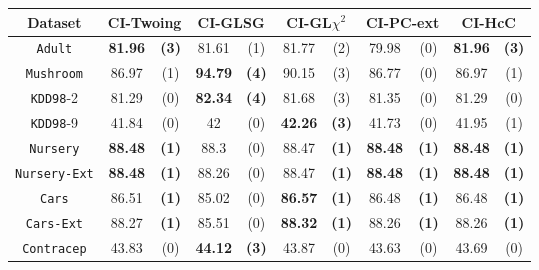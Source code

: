 \begin{table*}
\small
\centering
\begin{tabular}{c|cc|cc|cc|cc|cc} 
Dataset  &   \multicolumn{2}{c|}{CI-Twoing} &   \multicolumn{2}{c|}{CI-GLSG} & \multicolumn{2}{c|}{CI-GL$\chi^2$}& \multicolumn{2}{c|}{CI-PC-ext}& \multicolumn{2}{c}{CI-HcC} \\  \hline   
{\tt Adult}        &{\bf 81.96} &{\bf  (3)} & 81.61       & (1)       & 81.77       & (2)       & 79.98       & (0)       & {\bf 81.96} & {\bf  (3)}  \\
{\tt Mushroom}     &86.97       & (1)       &{\bf  94.79 }& {\bf (4)} & 90.15       & (3)       & 86.77       & (0)       & 86.97       & (1)         \\
{\tt KDD98}-2      &81.29       & (0)       & {\bf 82.34 }& {\bf (4)} & 81.68       & (3)       & 81.35       & (0)       & 81.29       & (0)         \\
{\tt KDD98}-9      &41.84       & (0)       & 42          & (0)       & {\bf 42.26} & {\bf (3)} & 41.73       & (0)       & 41.95       &  (1)        \\
{\tt Nursery}      &{\bf 88.48} & {\bf (1)} & 88.3        & (0)       & 88.47       & {\bf (1)} &{\bf 88.48 } & {\bf (1)} & {\bf 88.48} & {\bf (1)}   \\
{\tt Nursery-Ext}  &{\bf 88.48} & {\bf (1)} & 88.26       & (0)       & 88.47       & {\bf (1)} &{\bf 88.48 } & {\bf (1)} & {\bf 88.48} & {\bf (1)}   \\
{\tt Cars}         &86.51       & {\bf (1)} & 85.02       & (0)       & {\bf 86.57} & {\bf (1)} & 86.48       & {\bf (1)} & 86.48       & {\bf (1)}   \\
{\tt Cars-Ext}     &88.27       & {\bf (1)} & 85.51       & (0)       & {\bf 88.32} & {\bf (1)} & 88.26       & {\bf (1)} & 88.26       & {\bf (1)}   \\
{\tt Contracep}    &43.83       & (0)       & {\bf 44.12} & {\bf (3)} & 43.87       & (0)       & 43.63       & (0)       & 43.69       & (0)         \\

\end{tabular}
\end{table*}
